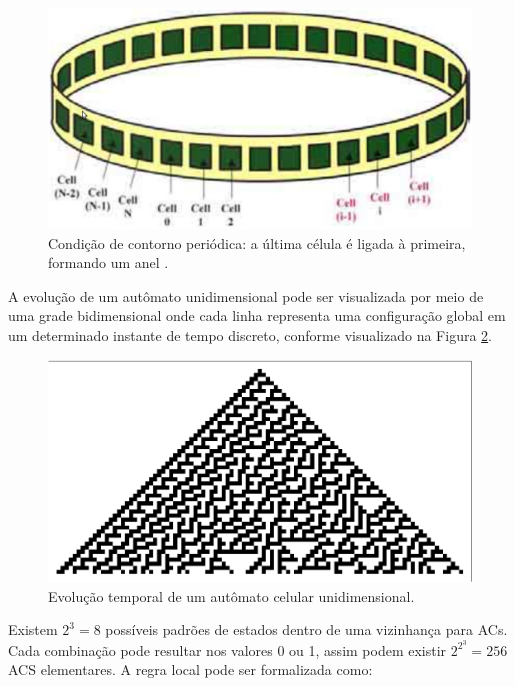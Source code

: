 \documentclass[12pt,a4paper]{article}
\begin{document}
\begin{figure}[htp]
\begin{center}
\includegraphics[scale=0.3]{img/ring.eps}
\caption{Condição de contorno periódica: a última célula é ligada à primeira,
formando um anel .}
\label{fig:ring}
\end{center}
\end{figure}

A evolução de um autômato unidimensional pode ser visualizada por meio de uma grade bidimensional
onde cada linha representa uma configuração global em um determinado instante de tempo discreto,
conforme visualizado na Figura \ref{fig:celautomaton}.

\begin{figure}[htp]
\begin{center}
\includegraphics[scale=0.8]{img/CellularAutomaton.eps}
\caption{Evolução temporal de um autômato celular unidimensional.}
\label{fig:celautomaton}
\end{center}
\end{figure}

Existem $2^3=8$ possíveis padrões de estados dentro de uma vizinhança para ACs.
Cada combinação pode resultar nos valores 0 ou 1, assim podem existir $2^{2^3}=256$ ACS
elementares. A regra local pode ser formalizada como:
\end{document}
